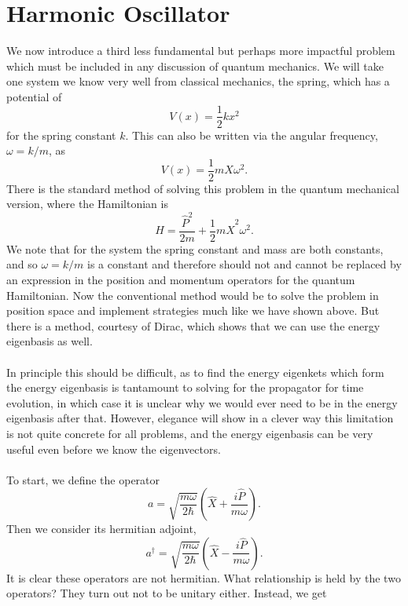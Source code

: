 \section{Harmonic Oscillator \ast}
We now introduce a third less fundamental but perhaps more impactful problem which must be included in any discussion of quantum mechanics. We will take one system we know very well from classical mechanics, the spring, which has a potential of 
$$
V(x)=\frac{1}{2}kx^2
$$
for the spring constant $k$. This can also be written via the angular frequency, $\omega=k/m$, as 
$$
V(x)=\frac{1}{2}mX\omega^{2}.
$$
There is the standard method of solving this problem in the quantum mechanical version, where the Hamiltonian is 
$$
\hat{H}=\frac{\hat{P}^2}{2m}+\frac{1}{2}m\hat{X}^{2}\omega^{2}.
$$
We note that for the system the spring constant and mass are both constants, and so $\omega=k/m$ is a constant and therefore should not and cannot be replaced by an expression in the position and momentum operators for the quantum Hamiltonian. Now the conventional method would be to solve the problem in position space and implement strategies much like we have shown above. But there is a method, courtesy of Dirac, which shows that we can use the energy eigenbasis as well.
\\\\
In principle this should be difficult, as to find the energy eigenkets which form the energy eigenbasis is tantamount to solving for the propagator for time evolution, in which case it is unclear why we would ever need to be in the energy eigenbasis after that. However, elegance will show in a clever way this limitation is not quite concrete for all problems, and the energy eigenbasis can be very useful even before we know the eigenvectors.
\\\\
To start, we define the operator
$$
a=\sqrt{\frac{m\omega}{2\hbar}}\left(\hat{X}+\frac{i\hat{P}}{m\omega}\right).
$$
Then we consider its hermitian adjoint,
$$
a^{\dagger}=\sqrt{\frac{m\omega}{2\hbar}}\left(\hat{X}-\frac{i\hat{P}}{m\omega}\right).
$$ 
It is clear these operators are not hermitian. What relationship is held by the two operators? They turn out not to be unitary either. Instead, we get 
